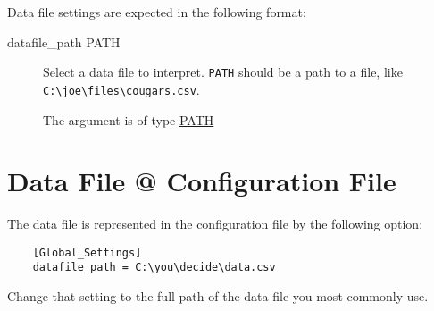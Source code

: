 Data file settings are expected in the following format:

\begin{description}

\item[datafile\_path PATH]
\hypertarget{global-datafile-path}{}

Select a data file to interpret. \verb=PATH= should be a path to a file,
like \verb=C:\joe\files\cougars.csv=.

The argument is of type \hyperlink{argument-type-path}{PATH}

\end{description}


\section{Data File @ Configuration File}

The data file is represented in the configuration file by the
following option:

\begin{verbatim}
    [Global_Settings]
    datafile_path = C:\you\decide\data.csv
\end{verbatim}

Change that setting to the full path of the data file you most commonly use.

